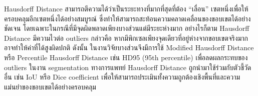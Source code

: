 Hausdorff Distance สามารถตีความได้ว่าเป็นระยะทางที่มากที่สุดที่ต้อง “เลื่อน” เซตหนึ่งเพื่อให้ครอบคลุมอีกเซตหนึ่งได้อย่างสมบูรณ์ ซึ่งทำให้สามารถสะท้อนความคลาดเคลื่อนของขอบเขตได้อย่างชัดเจน โดยเฉพาะในกรณีที่มีจุดผิดพลาดเพียงบางส่วนแต่มีระยะห่างมาก
อย่างไรก็ตาม Hausdorff Distance มีความไวต่อ outliers กล่าวคือ หากมีพิกเซลเพียงจุดเดียวที่อยู่ห่างจากขอบเขตจริงมาก อาจทำให้ค่าที่ได้สูงผิดปกติ ดังนั้น ในงานวิจัยบางส่วนจึงมีการใช้ Modified Hausdorff Distance หรือ Percentile Hausdorff Distance เช่น HD95 (95th percentile) เพื่อลดผลกระทบของ outliers \cite{dubuisson1994modified}
ในงาน segmentation ทางการแพทย์ Hausdorff Distance ถูกนำมาใช้ร่วมกับตัวชี้วัดอื่น เช่น IoU หรือ Dice coefficient เพื่อให้สามารถประเมินทั้งความถูกต้องเชิงพื้นที่และความแม่นยำของขอบเขตได้อย่างครอบคลุม \cite{taha2015metrics}







